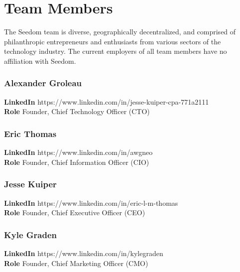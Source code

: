 \documentclass[11pt]{article}
\begin{document}
\section{Team Members}

The Seedom team is diverse, geographically decentralized, and comprised of philanthropic entrepreneurs and enthusiasts from various sectors of the technology industry. The current employers of all team members have no affiliation with Seedom.

\subsubsection{Alexander Groleau}
\begin{minipage}{\textwidth}
\textbf{LinkedIn} https://www.linkedin.com/in/jesse-kuiper-cpa-771a2111\\
\textbf{Role} Founder, Chief Technology Officer (CTO)\\
\end{minipage}

\subsubsection{Eric Thomas}
\begin{minipage}{\textwidth}
\textbf{LinkedIn} https://www.linkedin.com/in/awgneo\\
\textbf{Role} Founder, Chief Information Officer (CIO)\\
\end{minipage}

\subsubsection{Jesse Kuiper}
\begin{minipage}{\textwidth}
\textbf{LinkedIn} https://www.linkedin.com/in/eric-l-m-thomas\\
\textbf{Role} Founder, Chief Executive Officer (CEO)\\
\end{minipage}

\subsubsection{Kyle Graden}
\begin{minipage}{\textwidth}
\textbf{LinkedIn} https://www.linkedin.com/in/kylegraden\\
\textbf{Role} Founder, Chief Marketing Officer (CMO)\\
\end{minipage}

\pagebreak

\printbibliography

\vspace*{\fill}

\begin{flushright}

\pdfcreationdate
\end{flushright}
\end{document}
